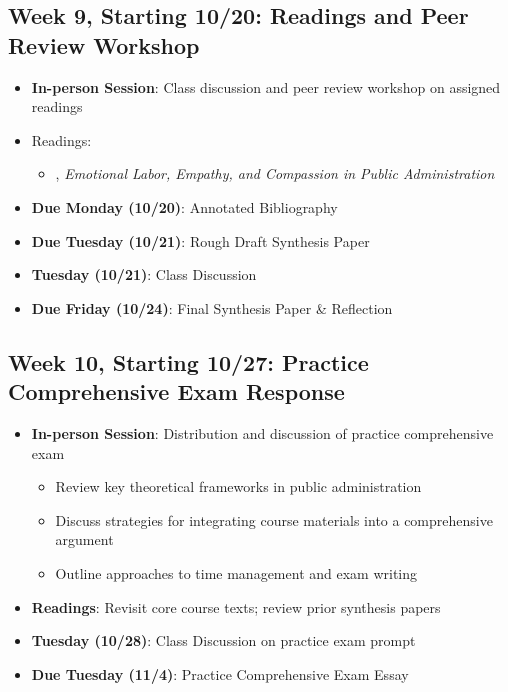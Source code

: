 \documentclass[12pt, letterpaper]{article}
\begin{document}
\subsection*{Week 9, Starting 10/20: Readings and Peer Review Workshop}
\begin{itemize}
    \item \textbf{In-person Session}: Class discussion and peer review workshop on assigned readings
    \item Readings:
        \begin{itemize}
            \item \cite{guy2004emotional}, \emph{Emotional Labor, Empathy, and Compassion in Public Administration}
        \end{itemize}
    \item \textbf{Due Monday (10/20)}: Annotated Bibliography
    \item \textbf{Due Tuesday (10/21)}: Rough Draft Synthesis Paper
    \item \textbf{Tuesday (10/21)}: Class Discussion
    \item \textbf{Due Friday (10/24)}: Final Synthesis Paper \& Reflection
\end{itemize}

\subsection*{Week 10, Starting 10/27: Practice Comprehensive Exam Response}
\begin{itemize}
    \item \textbf{In-person Session}: Distribution and discussion of practice comprehensive exam
    \begin{itemize}
        \item Review key theoretical frameworks in public administration
        \item Discuss strategies for integrating course materials into a comprehensive argument
        \item Outline approaches to time management and exam writing
    \end{itemize}
    \item \textbf{Readings}: Revisit core course texts; review prior synthesis papers
    \item \textbf{Tuesday (10/28)}: Class Discussion on practice exam prompt
    \item \textbf{Due Tuesday (11/4)}: Practice Comprehensive Exam Essay 
\end{itemize}
\end{document}
